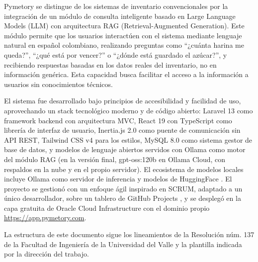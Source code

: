 Pymetory se distingue de los sistemas de inventario convencionales por la integración de un módulo de consulta inteligente basado en Large Language Models (LLM) con arquitectura RAG (Retrieval-Augmented Generation). Este módulo permite que los usuarios interactúen con el sistema mediante lenguaje natural en español colombiano, realizando preguntas como ``¿cuánta harina me queda?'', ``¿qué está por vencer?'' o ``¿dónde está guardado el azúcar?'', y recibiendo respuestas basadas en los datos reales del inventario, no en información genérica. Esta capacidad busca facilitar el acceso a la información a usuarios sin conocimientos técnicos.

El sistema fue desarrollado bajo principios de accesibilidad y facilidad de uso, aprovechando un stack tecnológico moderno y de código abierto: Laravel 13 \cite{laravel11} como framework backend con arquitectura MVC, React 19 con TypeScript como librería de interfaz de usuario, Inertia.js 2.0 \cite{inertiajs} como puente de comunicación sin API REST, Tailwind CSS v4 para los estilos, MySQL 8.0 como sistema gestor de base de datos, y modelos de lenguaje abiertos servidos con Ollama como motor del módulo RAG \cite{rag_lewis2020} (en la versión final, gpt-oss:120b en Ollama Cloud, con respaldos en la nube y en el propio servidor). El ecosistema de modelos locales incluye Ollama \cite{ollama_rest_api} como servidor de inferencia y modelos de HuggingFace \cite{huggingface}. El proyecto se gestionó con un enfoque ágil inspirado en SCRUM, adaptado a un único desarrollador, sobre un tablero de GitHub Projects \cite{github_projects}, y se desplegó en la capa gratuita de Oracle Cloud Infrastructure con el dominio propio \url{https://app.pymetory.com}.

La estructura de este documento sigue los lineamientos de la Resolución núm. 137 de la Facultad de Ingeniería de la Universidad del Valle \cite{univalle_resolucion137} y la plantilla indicada por la dirección del trabajo.
